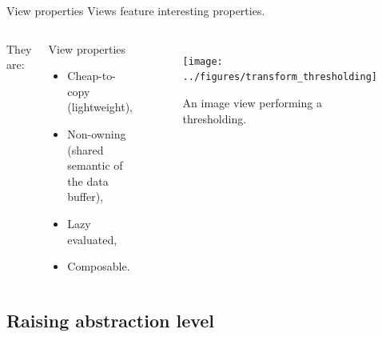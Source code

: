 \documentclass[12pt,aspectratio=169]{beamer}
\begin{document}



\begin{frame}[fragile]{View properties}
  Views feature interesting properties.
  \begin{columns}[T,onlytextwidth]
    They are:
    \begin{alertblock}{View properties}
      \begin{itemize}
        \item Cheap-to-copy (lightweight),
        \item Non-owning (shared semantic of the data buffer),
        \item Lazy evaluated,
        \item Composable.
      \end{itemize}
    \end{alertblock}

    \begin{figure}
      \begin{minipage}{\linewidth}
        \texttt{[image: ../figures/transform\_thresholding]}
      \end{minipage}
      \caption{An image view performing a thresholding.}
      \label{fig.view.threshold}
    \end{figure}
  \end{columns}
\end{frame}

\subsection{Raising abstraction level}
\end{document}
